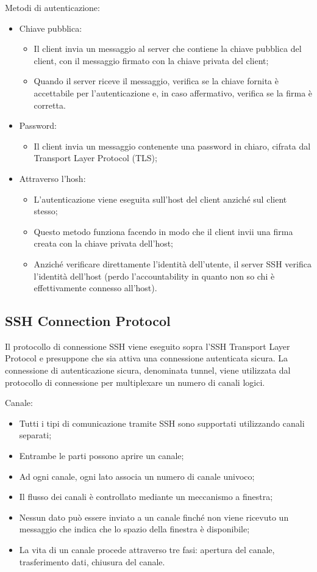 Metodi di autenticazione:
\begin{itemize}
    \item Chiave pubblica: 
	\begin{itemize}
	    \item Il client invia un messaggio al server che contiene la chiave pubblica del client, con il messaggio firmato con la chiave privata del client;
		\item Quando il server riceve il messaggio, verifica se la chiave fornita è accettabile per l'autenticazione e, in caso affermativo, verifica se la firma è corretta.
	\end{itemize}
	\item Password: 
	\begin{itemize}
	    \item Il client invia un messaggio contenente una password in chiaro, cifrata dal Transport Layer Protocol (TLS);
	\end{itemize}
	\item Attraverso l'hosh:
	\begin{itemize}
	    \item L'autenticazione viene eseguita sull'host del client anziché sul client stesso;
		\item Questo metodo funziona facendo in modo che il client invii una firma creata con la chiave privata dell'host;
		\item Anziché verificare direttamente l'identità dell'utente, il server SSH verifica l'identità dell'host (perdo l'accountability in quanto non so chi è effettivamente connesso all'host).
	\end{itemize}
\end{itemize}

\subsection{SSH Connection Protocol}

Il protocollo di connessione SSH viene eseguito sopra l'SSH Transport Layer Protocol e presuppone che sia attiva una connessione autenticata sicura. La connessione di autenticazione sicura, denominata tunnel, viene utilizzata dal protocollo di connessione per multiplexare un numero di canali logici.

Canale:
\begin{itemize}
    \item Tutti i tipi di comunicazione tramite SSH sono supportati utilizzando canali separati;
	\item Entrambe le parti possono aprire un canale;
	\item Ad ogni canale, ogni lato associa un numero di canale univoco;
	\item Il flusso dei canali è controllato mediante un meccanismo a finestra;
	\item Nessun dato può essere inviato a un canale finché non viene ricevuto un messaggio che indica che lo spazio della finestra è disponibile;
	\item La vita di un canale procede attraverso tre fasi: apertura del canale, trasferimento dati, chiusura del canale.
\end{itemize}

